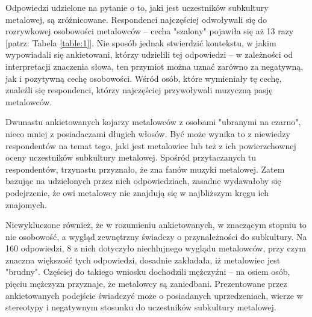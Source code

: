 \documentclass[12pt, a4paper, titlepage]{report}
\begin{document}
Odpowiedzi udzielone na pytanie o to, jaki jest uczestników subkultury metalowej, są zróżnicowane. Respondenci najczęściej odwoływali się do rozrywkowej osobowości metalowców -- cecha "szalony" pojawiła się aż 13 razy [patrz: Tabela \ref{table:1}]. Nie sposób jednak stwierdzić kontekstu, w jakim wypowiadali się ankietowani, którzy udzielili tej odpowiedzi -- w zależności od interpretacji znaczenia słowa, ten przymiot można uznać zarówno za negatywną, jak i pozytywną cechę osobowości. Wśród osób, które wymieniały tę cechę, znaleźli się respondenci, którzy najczęściej przywoływali muzyczną pasję metalowców. 

Dwunastu ankietowanych kojarzy metalowców z osobami "ubranymi na czarno", nieco mniej z posiadaczami długich włosów. Być może wynika to z niewiedzy respondentów na temat tego, jaki jest metalowiec lub też z ich powierzchownej oceny uczestników subkultury metalowej.  Spośród przytaczanych tu respondentów, trzynastu przyznało, że zna fanów muzyki metalowej. Zatem bazując na udzielonych przez nich odpowiedziach, zasadne wydawałoby się podejrzenie, że owi metalowcy nie znajdują się w najbliższym kręgu ich znajomych. 

Niewykluczone również, że w rozumieniu ankietowanych, w znaczącym stopniu to nie osobowość, a wygląd zewnętrzny świadczy o przynależności do subkultury. Na 160 odpowiedzi, 8 z nich dotyczyło niechlujnego wyglądu metalowców, przy czym znaczna większość tych odpowiedzi, dosadnie zakładała, iż metalowiec jest "brudny". Częściej do takiego wniosku dochodzili mężczyźni -- na osiem osób, pięciu mężczyzn przyznaje, że metalowcy są zaniedbani. Prezentowane przez ankietowanych podejście świadczyć może o posiadanych uprzedzeniach, wierze w stereotypy i negatywnym stosunku do uczestników subkultury metalowej. 
\end{document}
